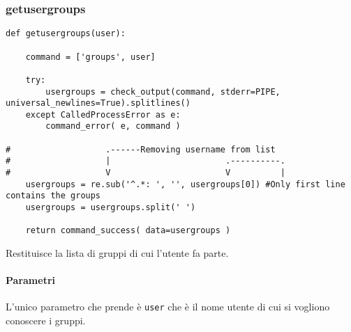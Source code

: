 \documentclass[11pt]{article}
\begin{document}
\subsubsection{getusergroups}\label{getusergroups}
\begin{lstlisting}
def getusergroups(user):

    command = ['groups', user]
    
    try:
        usergroups = check_output(command, stderr=PIPE, universal_newlines=True).splitlines()
    except CalledProcessError as e:
        command_error( e, command )

#                   .------Removing username from list
#                   |                       .----------.
#                   V                       V          | 
    usergroups = re.sub('^.*: ', '', usergroups[0]) #Only first line contains the groups
    usergroups = usergroups.split(' ')

    return command_success( data=usergroups )
\end{lstlisting}
Restituisce la lista di gruppi di cui l'utente fa parte.
\paragraph{Parametri}
L'unico parametro che prende è \texttt{user} che è il nome utente di cui si vogliono conoscere i gruppi.
\end{document}

